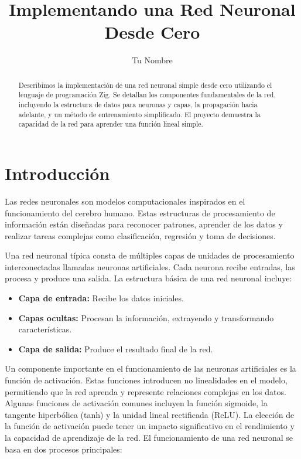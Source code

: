 \documentclass[twocolumn]{article}
\title{Implementando una Red Neuronal Desde Cero}
\author{Tu Nombre}
\date{}
\begin{document}
\maketitle

\begin{abstract}
Describimos la implementación de una red neuronal simple desde cero utilizando el lenguaje de programación Zig. Se detallan los componentes fundamentales de la red, incluyendo la estructura de datos para neuronas y capas, la propagación hacia adelante, y un método de entrenamiento simplificado. El proyecto demuestra la capacidad de la red para aprender una función lineal simple.
\end{abstract}

\section{Introducción}
Las redes neuronales son modelos computacionales inspirados en el funcionamiento del cerebro humano. Estas estructuras de procesamiento de información están diseñadas para reconocer patrones, aprender de los datos y realizar tareas complejas como clasificación, regresión y toma de decisiones.

Una red neuronal típica consta de múltiples capas de unidades de procesamiento interconectadas llamadas neuronas artificiales. Cada neurona recibe entradas, las procesa y produce una salida. La estructura básica de una red neuronal incluye:

\begin{itemize}
    \item \textbf{Capa de entrada:} Recibe los datos iniciales.
    \item \textbf{Capas ocultas:} Procesan la información, extrayendo y transformando características.
    \item \textbf{Capa de salida:} Produce el resultado final de la red.
\end{itemize}

Un componente importante en el funcionamiento de las neuronas artificiales es la función de activación. Estas funciones introducen no linealidades en el modelo, permitiendo que la red aprenda y represente relaciones complejas en los datos. Algunas funciones de activación comunes incluyen la función sigmoide, la tangente hiperbólica (tanh) y la unidad lineal rectificada (ReLU). La elección de la función de activación puede tener un impacto significativo en el rendimiento y la capacidad de aprendizaje de la red.
El funcionamiento de una red neuronal se basa en dos procesos principales:
\end{document}
